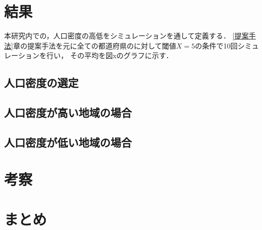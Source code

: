 \documentclass[a4paper, 11pt]{ltjsarticle}
\begin{document}
\section{結果}
本研究内での，人口密度の高低をシミュレーションを通して定義する．
\ref{提案手法}章の提案手法を元に全ての都道府県のに対して閾値$X = 5$の条件で10回シミュレーションを行い，
その平均を図xのグラフに示す．
\subsection{人口密度の選定}

\subsection{人口密度が高い地域の場合}

\subsection{人口密度が低い地域の場合}

\clearpage
\section{考察}

\clearpage
\section{まとめ}

\clearpage


\end{document}
